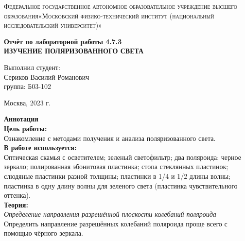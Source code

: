 \documentclass[a4paper, 12pt]{article}%
\begin{document}
	\begin{titlepage}
		\begin{center}
			\textsc{Федеральное государственное автономное образовательное учреждение высшего образования«Московский физико-технический институт (национальный исследовательский университет)»\\[5mm]
			}
			
			\vfill
			
			\textbf{Отчёт по лабораторной работы 4.7.3\\[3mm]
				ИЗУЧЕНИЕ
				ПОЛЯРИЗОВАННОГО СВЕТА 
				\\[50mm]
			}
			
		\end{center}
		
		\hfill
		\begin{minipage}{.5\textwidth}
			Выполнил студент:\\[2mm]
			Сериков Василий Романович\\[2mm]
			группа: Б03-102\\[5mm]
			
		\end{minipage}
		\vfill
		\begin{center}
			Москва, 2023 г.
		\end{center}
		
	\end{titlepage}
	
	\newpage
	\setcounter{page}{2}
	
	\textbf{Аннотация}\\
	
	
	\textbf{Цель работы: }\\
	Ознакомление с методами получения и анализа поляризованного света.\\
	
	\textbf{В работе используется: }\\
	Оптическая скамья с осветителем; зеленый светофильтр; два поляроида; черное зеркало; полированная эбонитовая пластинка; стопа стеклянных пластинок; слюдяные пластинки разной толщины; пластинки в 1/4 и 1/2 длины волны; пластинка
	в одну длину волны для зеленого света (пластинка чувствительного
	оттенка).\\
	
	\textbf{Теория: }\\
	
	\textit{Определение направления разрешённой плоскости колебаний поляроида}\\
	
	Определить направление разрешённых колебаний поляроида проще всего с помощью чёрного зеркала.
	
\end{document}
